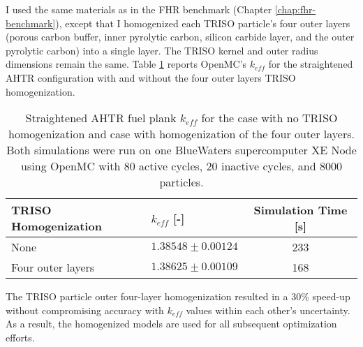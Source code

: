 I used the same materials as in the \gls{FHR} benchmark (Chapter \ref{chap:fhr-benchmark}), 
except that I homogenized each \gls{TRISO} particle's four outer layers (porous carbon 
buffer, inner pyrolytic carbon, silicon carbide layer, and the outer pyrolytic carbon) 
into a single layer. 
The \gls{TRISO} kernel and outer radius dimensions remain the same.
Table \ref{tab:keff_triso} reports OpenMC's $k_{eff}$ for the straightened \gls{AHTR} configuration 
with and without the four outer layers \gls{TRISO} homogenization.
\begin{table}[htbp]
    \centering
    \onehalfspacing
    \caption{Straightened \acrfull{AHTR} fuel plank $k_{eff}$ for the case with 
    no \gls{TRISO} homogenization and case with homogenization of the four outer 
    layers. Both simulations were run on one BlueWaters supercomputer XE Node 
    \cite{ncsa_about_2017} using OpenMC \cite{romano_openmc:_2015} with 80 active 
    cycles, 20 inactive cycles, and 8000 particles.}
	\label{tab:keff_triso}
    \footnotesize
    \begin{tabular}{llc}
    \hline 
    \textbf{TRISO Homogenization}& \textbf{$k_{eff}$ [-]} & \textbf{Simulation Time [s]}  \\
    \hline 
    None & $1.38548 \pm 0.00124$ & 233\\ 
    Four outer layers & $1.38625 \pm 0.00109$ & 168\\ 
    \hline
    \end{tabular}
\end{table}
The \gls{TRISO} particle outer four-layer homogenization resulted in a $30\%$ 
speed-up without compromising accuracy with $k_{eff}$ values within each 
other's uncertainty.
As a result, the homogenized models are used for all subsequent optimization efforts. 

